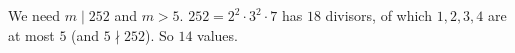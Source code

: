 We need $m\mid252$ and $m>5$. $252=2^2\cdot3^2\cdot7$ has $18$ divisors, of which $1,2,3,4$ are at most $5$ (and $5\nmid252$). So $\boxed{14}$ values.
